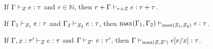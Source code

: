 \begin{thm}
  If $ \Gamma \vdash_{ Z} e : \tau $ and $r \in \mathbb{N}$,
  then $ r+\Gamma \vdash_{ r+ Z} e : r+ \tau $.
\end{thm}

\begin{thm}
  If $ \Gamma_1 \vdash_{ Z_1} e : \tau $ and $ \Gamma_2 \vdash_{ Z_2} e : \tau $,
  then $\max(\Gamma_1,\Gamma_2) \vdash_{\max( Z_1 , Z_2 )} e : \tau $.
\end{thm}

\begin{thm}[Substitution]
  If $ \Gamma,x : \tau' \vdash_{ Z} e : \tau $ and $
  \Gamma \vdash_{Z'} v : \tau'  $, then  $\Gamma
  \vdash_{\max(Z,Z' )} e[v/x]  : \tau$.
\end{thm}

